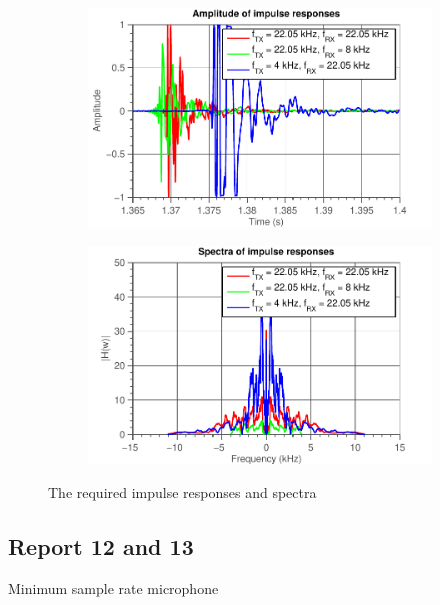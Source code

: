\documentclass[11pt,titlepage]{report}
\begin{document}
\begin{figure}[H]
	\centering
	\begin{subfigure}{0.49\textwidth}
		\includegraphics[width=\textwidth]{../../deliverable-7-resources/figures/ass-1/report-11-12-13/ass-1-report-11-time.pdf}
	\end{subfigure}
	\begin{subfigure}{0.49\textwidth}
		\includegraphics[width=\textwidth]{../../deliverable-7-resources/figures/ass-1/report-11-12-13/ass-1-report-11.pdf}
	\end{subfigure}
	\caption{The required impulse responses and spectra}
	\label{fig:rep11-impulse-spectra}
\end{figure}



\subsection{Report 12 and 13}
Minimum sample rate \@ microphone
\end{document}
